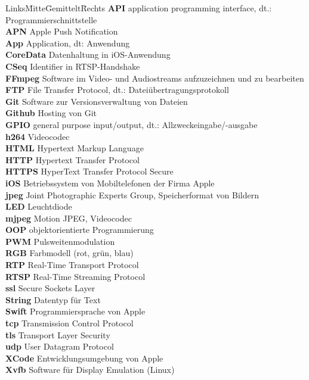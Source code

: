 
\begin{tabbing}
	Links\=Mitte\=Gemittelt\=Rechts\kill
\textbf{API}\> \> \> application programming interface, dt.: Programmierschnittstelle\\
\textbf{APN}\> \> \> Apple Push Notification\\
\textbf{App}\> \> \> Application, dt: Anwendung\\
\textbf{CoreData}\> \> \> Datenhaltung in iOS-Anwendung\\
\textbf{CSeq}\> \> \> Identifier in RTSP-Handshake\\
\textbf{FFmpeg}\> \> \> Software im Video- und Audiostreams aufzuzeichnen und zu bearbeiten\\
\textbf{FTP}\> \> \> File Transfer Protocol, dt.: Dateiübertragungsprotokoll\\
\textbf{Git}\> \> \> Software zur Versionsverwaltung von Dateien\\
\textbf{Github}\> \> \> Hosting von Git\\
\textbf{GPIO}\> \> \> general purpose input/output, dt.: Allzweckeingabe/-ausgabe \\
\textbf{h264}\> \> \> Videocodec\\
\textbf{HTML}\> \> \> Hypertext Markup Language \\
\textbf{HTTP}\> \> \> Hypertext Transfer Protocol \\
\textbf{HTTPS}\> \> \> HyperText Transfer Protocol Secure \\
\textbf{iOS}\> \> \> Betriebssystem von Mobiltelefonen der Firma Apple\\
\textbf{jpeg}\> \> \> Joint Photographic Experts Group, Speicherformat von Bildern\\
\textbf{LED}\> \> \> Leuchtdiode\\
\textbf{mjpeg}\> \> \> Motion JPEG, Videocodec\\
\textbf{OOP}\> \> \> objektorientierte Programmierung \\
\textbf{PWM}\> \> \> Pulsweitenmodulation\\
\textbf{RGB}\> \> \> Farbmodell (rot, grün, blau)\\
\textbf{RTP}\> \> \> Real-Time Transport Protocol\\
\textbf{RTSP}\> \> \> Real-Time Streaming Protocol\\
\textbf{ssl}\> \> \> Secure Sockets Layer\\
\textbf{String}\> \> \> Datentyp für Text\\
\textbf{Swift}\> \> \> Programmiersprache von Apple\\
\textbf{tcp}\> \> \> Transmission Control Protocol\\
\textbf{tls}\> \> \> Transport Layer Security \\
\textbf{udp}\> \> \> User Datagram Protocol\\
\textbf{XCode}\> \> \> Entwicklungsumgebung von Apple\\
\textbf{Xvfb}\> \> \> Software für Display Emulation (Linux)\\
\end{tabbing}